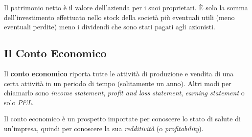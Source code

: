 \documentclass[a4paper,portrait,12pt]{article}
\theoremstyle{definition}
\begin{document}
Il patrimonio netto è il valore dell'azienda per i suoi proprietari. È solo la somma dell'investimento effettuato nello stock della società più eventuali utili (meno eventuali perdite) meno i dividendi che sono stati pagati agli azionisti.


\subsection{Il Conto Economico}


Il \textbf{conto economico} riporta tutte le attività di produzione e vendita di una certa attività in un periodo di tempo (solitamente un anno).
Altri modi per chiamarlo sono \emph{income statement}, \emph{profit and loss statement}, \emph{earning statement} o solo \emph{P\&L}.

Il conto economico è un prospetto importate per conoscere lo stato di salute di un'impresa, quindi per conoscere la sua \emph{redditività} (o \emph{profitability}).\\
\end{document}
